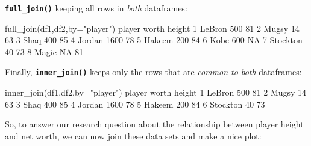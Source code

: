 \documentclass[
]{book}
\newenvironment{Shaded}{\begin{snugshade}}{\end{snugshade}}
\newcommand{\AttributeTok}[1]{\textcolor[rgb]{0.77,0.63,0.00}{#1}}
\newcommand{\ConstantTok}[1]{\textcolor[rgb]{0.00,0.00,0.00}{#1}}
\newcommand{\DecValTok}[1]{\textcolor[rgb]{0.00,0.00,0.81}{#1}}
\newcommand{\FunctionTok}[1]{\textcolor[rgb]{0.00,0.00,0.00}{#1}}
\newcommand{\NormalTok}[1]{#1}
\newcommand{\OtherTok}[1]{\textcolor[rgb]{0.56,0.35,0.01}{#1}}
\newcommand{\SpecialCharTok}[1]{\textcolor[rgb]{0.00,0.00,0.00}{#1}}
\newcommand{\StringTok}[1]{\textcolor[rgb]{0.31,0.60,0.02}{#1}}
\begin{document}
\textbf{\texttt{full\_join()}} keeping all rows in \emph{both} dataframes:

\begin{Shaded}
\begin{Highlighting}[]
\FunctionTok{full\_join}\NormalTok{(df1,df2,}\AttributeTok{by=}\StringTok{"player"}\NormalTok{)}
\NormalTok{    player worth height}
\DecValTok{1}\NormalTok{   LeBron   }\DecValTok{500}     \DecValTok{81}
\DecValTok{2}\NormalTok{    Mugsy    }\DecValTok{14}     \DecValTok{63}
\DecValTok{3}\NormalTok{     Shaq   }\DecValTok{400}     \DecValTok{85}
\DecValTok{4}\NormalTok{   Jordan  }\DecValTok{1600}     \DecValTok{78}
\DecValTok{5}\NormalTok{   Hakeem   }\DecValTok{200}     \DecValTok{84}
\DecValTok{6}\NormalTok{     Kobe   }\DecValTok{600}     \ConstantTok{NA}
\DecValTok{7}\NormalTok{ Stockton    }\DecValTok{40}     \DecValTok{73}
\DecValTok{8}\NormalTok{    Magic    }\ConstantTok{NA}     \DecValTok{81}
\end{Highlighting}
\end{Shaded}

Finally, \textbf{\texttt{inner\_join()}} keeps only the rows that are \emph{common to both} dataframes:

\begin{Shaded}
\begin{Highlighting}[]
\FunctionTok{inner\_join}\NormalTok{(df1,df2,}\AttributeTok{by=}\StringTok{"player"}\NormalTok{)}
\NormalTok{    player worth height}
\DecValTok{1}\NormalTok{   LeBron   }\DecValTok{500}     \DecValTok{81}
\DecValTok{2}\NormalTok{    Mugsy    }\DecValTok{14}     \DecValTok{63}
\DecValTok{3}\NormalTok{     Shaq   }\DecValTok{400}     \DecValTok{85}
\DecValTok{4}\NormalTok{   Jordan  }\DecValTok{1600}     \DecValTok{78}
\DecValTok{5}\NormalTok{   Hakeem   }\DecValTok{200}     \DecValTok{84}
\DecValTok{6}\NormalTok{ Stockton    }\DecValTok{40}     \DecValTok{73}
\end{Highlighting}
\end{Shaded}

So, to answer our research question about the relationship between player height and net worth, we can now join these data sets and make a nice plot:

\begin{Shaded}
\end{Shaded}
\end{document}
